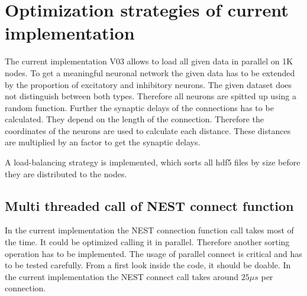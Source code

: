 \documentclass[a4paper]{article}
\begin{document}

\section{Optimization strategies of current implementation}
The current implementation V03 allows to load all given data in parallel on 1K nodes.
To get a meaningful neuronal network the given data has to be extended by the proportion of excitatory and inhibitory neurons.
The given dataset does not distinguish between both types.
Therefore all neurons are spitted up using a random function.
Further the synaptic delays of the connections has to be calculated.
They depend on the length of the connection.
Therefore the coordinates of the neurons are used to calculate each distance.
These distances are multiplied by an factor to get the synaptic delays.

A load-balancing strategy is implemented, which sorts all hdf5 files by size before they are distributed to the nodes.

\subsection{Multi threaded call of NEST connect function}
In the current implementation the NEST connection function call takes most of the time.
It could be optimized calling it in parallel. Therefore another sorting operation has to be implemented.
The usage of parallel connect is critical and has to be tested carefully.
From a first look inside the code, it should be doable.
In the current implementation the NEST connect call takes around $25 \mu s$ per connection. 
\end{document}
